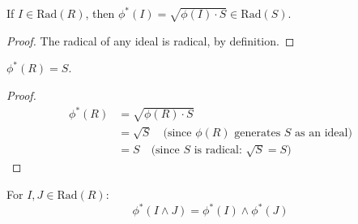 \begin{lemma}
  \label{lemma:radical-image}
  \leanok
  If $I \in \mathrm{Rad}(R)$, then $\phi^*(I) = \sqrt{\phi(I) \cdot S} \in \mathrm{Rad}(S)$.
\end{lemma}

\begin{proof}
  \leanok
  The radical of any ideal is radical, by definition.
\end{proof}

\begin{lemma}
  \label{lemma:preserve-top}
  \leanok
  $\phi^*(R) = S$.
\end{lemma}

\begin{proof}
  \leanok
  \begin{align*}
    \phi^*(R) &= \sqrt{\phi(R) \cdot S} \\
    &= \sqrt{S} \quad \text{(since } \phi(R) \text{ generates } S \text{ as an ideal)} \\
    &= S \quad \text{(since } S \text{ is radical: } \sqrt{S} = S \text{)}
  \end{align*}
\end{proof}

\begin{lemma}
  \label{lemma:preserve-finite-meets}
  \leanok
  For $I, J \in \mathrm{Rad}(R)$:
  $$\phi^*(I \land J) = \phi^*(I) \land \phi^*(J)$$
\end{lemma}

